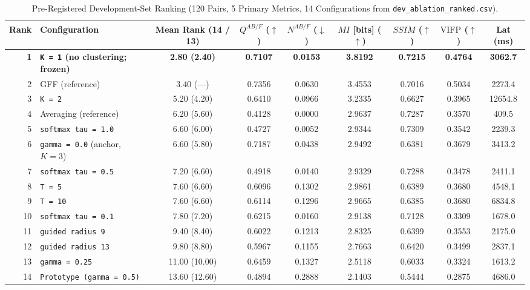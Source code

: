 \documentclass[conference]{IEEEtran}
\begin{document}
\begin{table}[htbp]
\caption{Pre-Registered Development-Set Ranking (120 Pairs, 5 Primary Metrics, 14 Configurations from \texttt{dev\_ablation\_ranked.csv}).}
\label{tab:dev_ablation}
\centering
\begin{tabular}{rlccccccc}
\toprule
\textbf{Rank} & \textbf{Configuration} & \textbf{Mean Rank (14 / 13)} & $Q^{AB/F}$ ($\uparrow$) & $N^{AB/F}$ ($\downarrow$) & $MI$ [bits] ($\uparrow$) & $SSIM$ ($\uparrow$) & $\mathrm{VIFP}$ ($\uparrow$) & \textbf{Lat (ms)} \\
\midrule
\textbf{1} & \textbf{\texttt{K = 1} (no clustering; frozen)} & \textbf{2.80 (2.40)} & \textbf{0.7107} & \textbf{0.0153} & \textbf{3.8192} & \textbf{0.7215} & \textbf{0.4764} & \textbf{3062.7} \\
2 & GFF (reference) & 3.40 (---) & 0.7356 & 0.0630 & 3.4553 & 0.7016 & 0.5034 & 2273.4 \\
3 & \texttt{K = 2} & 5.20 (4.20) & 0.6410 & 0.0966 & 3.2335 & 0.6627 & 0.3965 & 12654.8 \\
4 & Averaging (reference) & 6.20 (5.60) & 0.4128 & 0.0000 & 2.9637 & 0.7287 & 0.3570 & 409.5 \\
5 & \texttt{softmax tau = 1.0} & 6.60 (6.00) & 0.4727 & 0.0052 & 2.9344 & 0.7309 & 0.3542 & 2239.3 \\
6 & \texttt{gamma = 0.0} (anchor, $K=3$) & 6.60 (5.80) & 0.7187 & 0.0438 & 2.9492 & 0.6381 & 0.3679 & 3413.2 \\
7 & \texttt{softmax tau = 0.5} & 7.20 (6.60) & 0.4918 & 0.0140 & 2.9329 & 0.7288 & 0.3478 & 2411.1 \\
8 & \texttt{T = 5} & 7.60 (6.60) & 0.6096 & 0.1302 & 2.9861 & 0.6389 & 0.3680 & 4548.1 \\
9 & \texttt{T = 10} & 7.60 (6.60) & 0.6114 & 0.1296 & 2.9665 & 0.6385 & 0.3680 & 6834.8 \\
10 & \texttt{softmax tau = 0.1} & 7.80 (7.20) & 0.6215 & 0.0160 & 2.9138 & 0.7128 & 0.3309 & 1678.0 \\
11 & \texttt{guided radius 9} & 9.40 (8.40) & 0.6022 & 0.1213 & 2.8325 & 0.6399 & 0.3553 & 2175.0 \\
12 & \texttt{guided radius 13} & 9.80 (8.80) & 0.5967 & 0.1155 & 2.7663 & 0.6420 & 0.3499 & 2837.1 \\
13 & \texttt{gamma = 0.25} & 11.00 (10.00) & 0.6459 & 0.1327 & 2.5118 & 0.6033 & 0.3324 & 1613.2 \\
14 & \texttt{Prototype (gamma = 0.5)} & 13.60 (12.60) & 0.4894 & 0.2888 & 2.1403 & 0.5444 & 0.2875 & 4686.0 \\
\bottomrule
\end{tabular}
\end{table}
\end{document}
